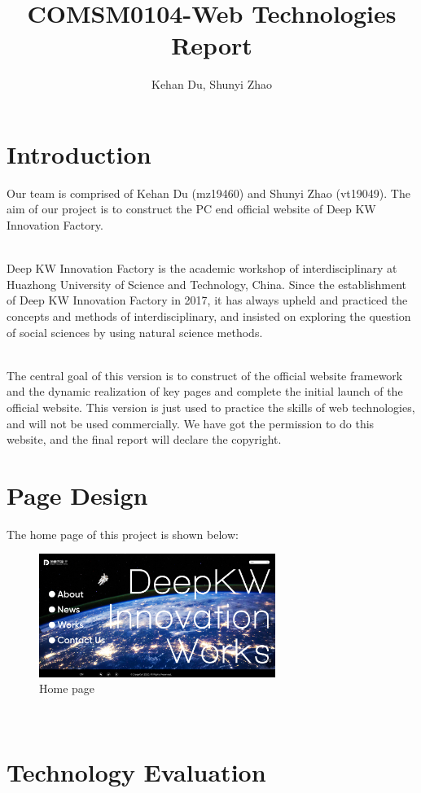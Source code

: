 \documentclass{article}
\title{COMSM0104-Web Technologies Report}
\author{Kehan Du, Shunyi Zhao}
\begin{document}
\maketitle

\section{Introduction}
Our team is comprised of Kehan Du (mz19460) and Shunyi Zhao (vt19049). The
aim of our project is to construct the PC end official website of Deep KW
Innovation Factory.

~\\
\noindent
Deep KW Innovation Factory is the academic workshop of interdisciplinary 
at Huazhong University of Science and Technology, China. Since the establishment 
of Deep KW Innovation Factory in 2017, it has always upheld and practiced 
the concepts and methods of interdisciplinary, and insisted on exploring 
the question of social sciences by using natural science methods.

~\\
\noindent
The central goal of this version is to construct of the official website 
framework and the dynamic realization of key pages and complete the initial 
launch of the official website. This version is just used to practice the skills
of web technologies, and will not be used commercially. We have got the
permission to do this website, and the final report will declare the copyright.

\section{Page Design}
The home page of this project is shown below:
\\
\begin{figure}[h]
    \centering
    \includegraphics[height=4cm]{img/02.png}
    \caption{Home page}
    \label{fig: figure1}
\end{figure}
\\
\section{Technology Evaluation}
\end{document}
